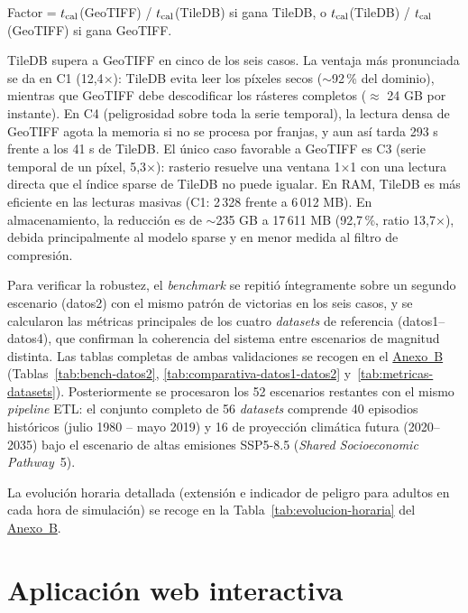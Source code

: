 Factor = $t_{\rm cal}$(GeoTIFF) / $t_{\rm cal}$(TileDB) si gana TileDB, o $t_{\rm cal}$(TileDB) / $t_{\rm cal}$(GeoTIFF) si gana GeoTIFF.

TileDB supera a GeoTIFF en cinco de los seis casos. La ventaja más pronunciada se da en C1 (12,4$\times$): TileDB evita leer los píxeles secos ($\sim$92\,\% del dominio), mientras que GeoTIFF debe descodificar los rásteres completos ($\approx$ 24 GB por instante). En C4 (peligrosidad sobre toda la serie temporal), la lectura densa de GeoTIFF agota la memoria si no se procesa por franjas, y aun así tarda 293 s frente a los 41 s de TileDB. El único caso favorable a GeoTIFF es C3 (serie temporal de un píxel, 5,3$\times$): rasterio resuelve una ventana 1$\times$1 con una lectura directa que el índice sparse de TileDB no puede igualar. En RAM, TileDB es más eficiente en las lecturas masivas (C1: 2\,328 frente a 6\,012 MB). En almacenamiento, la reducción es de $\sim$235 GB a 17\,611 MB (92,7\,\%, ratio 13,7$\times$), debida principalmente al modelo sparse y en menor medida al filtro de compresión.

Para verificar la robustez, el \textit{benchmark} se repitió íntegramente sobre un segundo escenario (datos2) con el mismo patrón de victorias en los seis casos, y se calcularon las métricas principales de los cuatro \textit{datasets} de referencia (datos1--datos4), que confirman la coherencia del sistema entre escenarios de magnitud distinta. Las tablas completas de ambas validaciones se recogen en el \hyperref[anexo-b.-tablas-de-resultados-completas]{Anexo~B} (Tablas~\ref{tab:bench-datos2}, \ref{tab:comparativa-datos1-datos2} y~\ref{tab:metricas-datasets}). Posteriormente se procesaron los 52 escenarios restantes con el mismo \textit{pipeline} ETL: el conjunto completo de 56 \textit{datasets} comprende 40 episodios históricos (julio 1980 -- mayo 2019) y 16 de proyección climática futura (2020--2035) bajo el escenario de altas emisiones SSP5-8.5 (\textit{Shared Socioeconomic Pathway}~5).

La evolución horaria detallada (extensión e indicador de peligro para adultos en cada hora de simulación) se recoge en la Tabla~\ref{tab:evolucion-horaria} del \hyperref[anexo-b.-tablas-de-resultados-completas]{Anexo~B}.

\section{Aplicación web interactiva}\label{aplicacion-web-interactiva}

